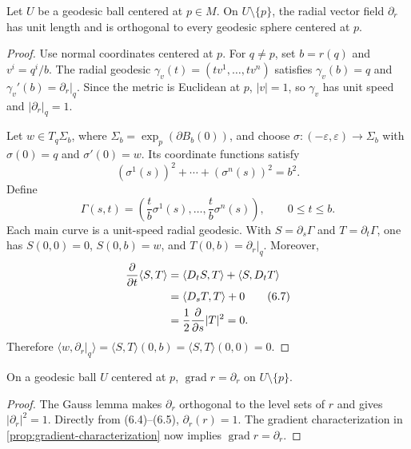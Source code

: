 \begin{theorem}
\label{thm:gauss-lemma}

Let $U$ be a geodesic ball centered at $p\in M$.  On
$U\setminus\{p\}$, the radial vector field $\partial_r$ has unit length and is
orthogonal to every geodesic sphere centered at $p$.
\end{theorem}

\begin{proof}
\sketch
Use normal coordinates centered at $p$.  For $q\ne p$, set $b=r(q)$ and
$v^i=q^i/b$.  The radial geodesic $\gamma_v(t)=(tv^1,\ldots,tv^n)$ satisfies
$\gamma_v(b)=q$ and $\gamma_v'(b)=\partial_r|_q$.  Since the metric is
Euclidean at $p$, $|v|=1$, so $\gamma_v$ has unit speed and
$|\partial_r|_q=1$.

Let $w\in T_q\Sigma_b$, where
$\Sigma_b=\exp_p(\partial B_b(0))$, and choose
$\sigma:(-\varepsilon,\varepsilon)\to\Sigma_b$ with
$\sigma(0)=q$ and $\sigma'(0)=w$.  Its coordinate functions satisfy
\begin{equation}
(\sigma^1(s))^2 + \cdots + (\sigma^n(s))^2 = b^2. \tag{6.6}
\end{equation}
Define
\[
\Gamma(s,t)=\left(\frac{t}{b}\sigma^1(s),\ldots,
\frac{t}{b}\sigma^n(s)\right),
\qquad 0\leq t\leq b.
\]
Each main curve is a unit-speed radial geodesic.  With
$S=\partial_s\Gamma$ and $T=\partial_t\Gamma$, one has
$S(0,0)=0$, $S(0,b)=w$, and $T(0,b)=\partial_r|_q$.  Moreover,
\begin{align}
\frac{\partial}{\partial t}\langle S,T\rangle
&=\langle D_tS,T\rangle+\langle S,D_tT\rangle \notag\\
&=\langle D_sT,T\rangle+0 \tag{6.7}\\
&=\frac12\frac{\partial}{\partial s}|T|^2=0. \notag
\end{align}
Therefore $\langle w,\partial_r|_q\rangle
=\langle S,T\rangle(0,b)=\langle S,T\rangle(0,0)=0$.
\end{proof}

\begin{corollary}
\label{cor:gradient-radial-distance}

On a geodesic ball $U$ centered at $p$,
$\operatorname{grad}r=\partial_r$ on $U\setminus\{p\}$.
\end{corollary}

\begin{proof}
\sketch
The Gauss lemma makes $\partial_r$ orthogonal to the level sets of $r$ and
gives $|\partial_r|^2=1$.  Directly from (6.4)--(6.5),
$\partial_r(r)=1$.  The gradient characterization in
\cref{prop:gradient-characterization} now
implies $\operatorname{grad}r=\partial_r$.
\end{proof}

